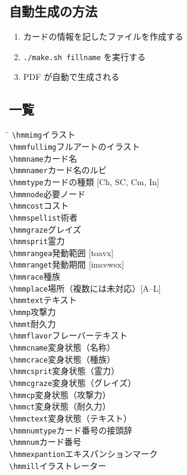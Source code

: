 \documentclass[line_length=22zw,number_of_lines=45,twocolumn]{jlreq}
\begin{document}
\subsection{自動生成の方法}
\begin{enumerate}
	\item カードの情報を記したファイルを作成する
	\item \texttt{./make.sh fillname} を実行する
	\item PDF が自動で生成される
\end{enumerate}

\subsection{一覧}
\begin{tabbing}
	\hspace{.4\linewidth}\=\kill
	\verb+\hmmimg+\>イラスト\\
	\verb+\hmmfullimg+\>フルアートのイラスト\\
	\verb+\hmmname+\>カード名\\
	\verb+\hmmnamer+\>カード名のルビ\\
	\verb+\hmmtype+\>カードの種類 [Ch, SC, Cm, In]\\
	\verb+\hmmnode+\>必要ノード\\
	\verb+\hmmcost+\>コスト\\
	\verb+\hmmspellist+\>術者\\
	\verb+\hmmgraze+\>グレイズ\\
	\verb+\hmmsprit+\>霊力\\
	\verb+\hmmrangea+\>発動範囲 [toavx]\\
	\verb+\hmmranget+\>発動期間 [imcewsx]\\
	\verb+\hmmrace+\>種族\\
	\verb+\hmmplace+\>場所（複数には未対応）[A--L]\\
	\verb+\hmmtext+\>テキスト\\
	\verb+\hmmp+\>攻撃力\\
	\verb+\hmmt+\>耐久力\\
	\verb+\hmmflavor+\>フレーバーテキスト\\
	\verb+\hmmcname+\>変身状態（名称）\\
	\verb+\hmmcrace+\>変身状態（種族）\\
	\verb+\hmmcsprit+\>変身状態（霊力）\\
	\verb+\hmmcgraze+\>変身状態（グレイズ）\\
	\verb+\hmmcp+\>変身状態（攻撃力）\\
	\verb+\hmmct+\>変身状態（耐久力）\\
	\verb+\hmmctext+\>変身状態（テキスト）\\
	\verb+\hmmnumtype+\>カード番号の接頭辞\\
	\verb+\hmmnum+\>カード番号\\
	\verb+\hmmexpantion+\>エキスパンションマーク\\
	\verb+\hmmill+\>イラストレーター\\
\end{tabbing}
\end{document}
